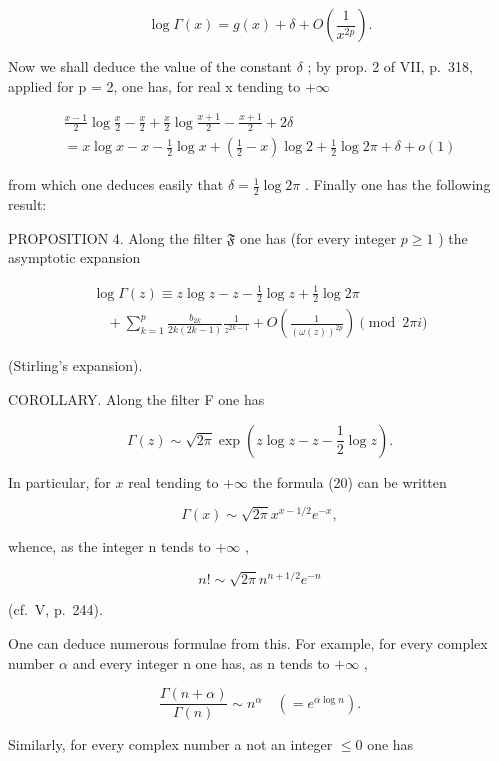 \[
\log \Gamma (x) = g (x) + \delta + O \left(\frac {1}{x ^ {2 p}}\right).
\]

Now we shall deduce the value of the constant \(\delta\) ; by prop. 2 of VII, p.~318, applied for p = 2, one has, for real x tending to \(+\infty\)

\[
\begin{array}{c} \frac {x - 1}{2} \log \frac {x}{2} - \frac {x}{2} + \frac {x}{2} \log \frac {x + 1}{2} - \frac {x + 1}{2} + 2 \delta \\ = x \log x - x - \frac {1}{2} \log x + (\frac {1}{2} - x) \log 2 + \frac {1}{2} \log 2 \pi + \delta + o (1) \end{array}
\]

from which one deduces easily that \(\delta = \frac{1}{2}\log 2\pi\) . Finally one has the following result:

PROPOSITION 4. Along the filter \(\mathfrak{F}\) one has (for every integer \(p \geqslant 1\) ) the asymptotic expansion

\[
\begin{array}{l} \log \Gamma (z) \equiv z \log z - z - \frac {1}{2} \log z + \frac {1}{2} \log 2 \pi \\ \quad + \sum_ {k = 1} ^ {p} \frac {b _ {2 k}}{2 k (2 k - 1)} \frac {1}{z ^ {2 k - 1}} + O \left(\frac {1}{(\omega (z)) ^ {2 p}}\right) \pmod {2 \pi i} \end{array}\tag{19}
\]

(Stirling's expansion).

COROLLARY. Along the filter F one has

\[
\Gamma (z) \sim \sqrt {2 \pi} \exp (z \log z - z - \frac {1}{2} \log z).\tag{20}
\]

In particular, for \(x\) real tending to \(+\infty\) the formula (20) can be written

\[
\Gamma (x) \sim \sqrt {2 \pi} x ^ {x - 1 / 2} e ^ {- x},\tag{21}
\]

whence, as the integer n tends to \(+\infty\) ,

\[
n! \sim \sqrt {2 \pi} n ^ {n + 1 / 2} e ^ {- n}
\]

(cf.~V, p.~244).

One can deduce numerous formulae from this. For example, for every complex number \(\alpha\) and every integer n one has, as n tends to \(+\infty\) ,

\[
\frac {\Gamma (n + \alpha)}{\Gamma (n)} \sim n ^ {\alpha} \quad (= e ^ {\alpha \log n}).\tag{22}
\]

Similarly, for every complex number a not an integer \(\leqslant 0\) one has

